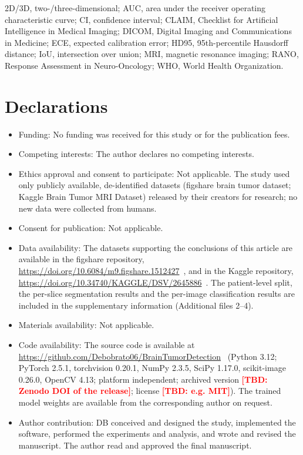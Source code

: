 \documentclass[pdflatex,sn-vancouver-num,iicol]{sn-jnl}
\newcommand{\tbd}[1]{\textcolor{red}{\textbf{[#1]}}}
\begin{document}
2D/3D, two-/three-dimensional; AUC, area under the receiver operating characteristic curve; CI, confidence interval; CLAIM, Checklist for Artificial Intelligence in Medical Imaging; DICOM, Digital Imaging and Communications in Medicine; ECE, expected calibration error; HD95, 95th-percentile Hausdorff distance; IoU, intersection over union; MRI, magnetic resonance imaging; RANO, Response Assessment in Neuro-Oncology; WHO, World Health Organization.

\section*{Declarations}
\begin{itemize}
\item Funding: No funding was received for this study or for the publication fees.
\item Competing interests: The author declares no competing interests.
\item Ethics approval and consent to participate: Not applicable. The study used only publicly available, de-identified datasets (figshare brain tumor dataset; Kaggle Brain Tumor MRI Dataset) released by their creators for research; no new data were collected from humans.
\item Consent for publication: Not applicable.
\item Data availability: The datasets supporting the conclusions of this article are available in the figshare repository, \url{https://doi.org/10.6084/m9.figshare.1512427}~\cite{cheng2017figshare}, and in the Kaggle repository, \url{https://doi.org/10.34740/KAGGLE/DSV/2645886}~\cite{nickparvar2021kaggle}. The patient-level split, the per-slice segmentation results and the per-image classification results are included in the supplementary information (Additional files 2--4).
\item Materials availability: Not applicable.
\item Code availability: The source code is available at \url{https://github.com/Debobrato06/BrainTumorDetection}~\cite{biswas2026repo} (Python 3.12; PyTorch 2.5.1, torchvision 0.20.1, NumPy 2.3.5, SciPy 1.17.0, scikit-image 0.26.0, OpenCV 4.13; platform independent; archived version \tbd{TBD: Zenodo DOI of the release}; license \tbd{TBD: e.g. MIT}). The trained model weights are available from the corresponding author on request.
\item Author contribution: DB conceived and designed the study, implemented the software, performed the experiments and analysis, and wrote and revised the manuscript. The author read and approved the final manuscript.
\end{itemize}


\end{document}
